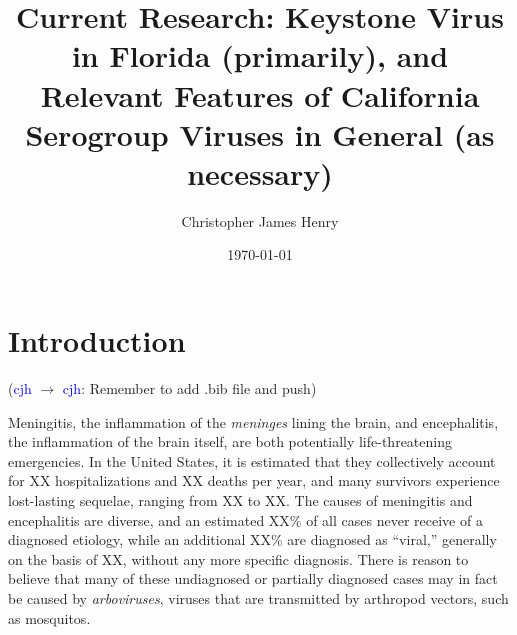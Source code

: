 \documentclass[12pt]{article}
\title%
{Current Research: Keystone Virus in Florida (primarily), and Relevant Features of California Serogroup Viruses in General (as necessary)}
\author%
{Christopher James Henry}
\date{\today}
\newcommand{\cjh}{\textcolor{blue}{cjh}}
\newcommand{\tjh}{\textcolor{red}{tjh}}
\newcommand{\msg}[3]{(#1 $\rightarrow$ #2: #3)}
\newcommand{\mcc}[1]{\msg\cjh\cjh{#1}}
\newcommand{\mtc}[1]{\msg\tjh\cjh{#1}}
\begin{document}
    \titlepage
    


    \section{Introduction}

        \mcc{Remember to add .bib file and push}

        Meningitis, the inflammation of the \textit{meninges} lining the brain, and encephalitis, the inflammation of the brain itself, are both potentially life-threatening emergencies. In the United States, it is estimated that they collectively account for XX hospitalizations and XX deaths per year, and many survivors experience lost-lasting sequelae, ranging from XX to XX. The causes of meningitis and encephalitis are diverse, and an estimated XX\% of all cases never receive of a diagnosed etiology, while an additional XX\% are diagnosed as ``viral,'' generally on the basis of XX, without any more specific diagnosis. There is reason to believe that many of these undiagnosed or partially diagnosed cases may in fact be caused by \textit{arboviruses}, viruses that are transmitted by arthropod vectors, such as mosquitos.
\end{document}
